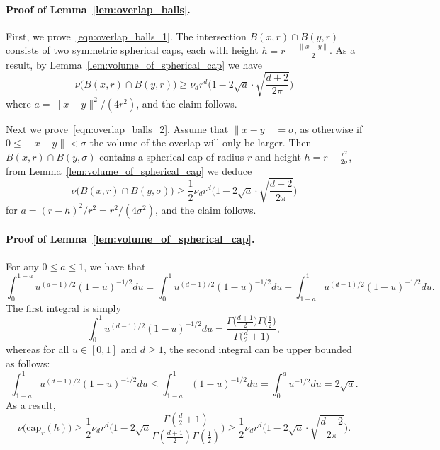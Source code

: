 \paragraph{Proof of Lemma~\ref{lem:overlap_balls}.}
	First, we prove~\eqref{eqn:overlap_balls_1}. The intersection $B(x,r) \cap B(y,r)$ consists of two symmetric spherical caps, each with height $h = r - \frac{\|x - y\|}{2}$. 
	As a result, by Lemma~\ref{lem:volume_of_spherical_cap} we have
	\begin{equation*}
	\nu\bigl(B(x,r) \cap B(y,r)\bigr) \geq \nu_d r^d \bigl(1 - 2\sqrt{a} \cdot \sqrt{\frac{d + 2}{2\pi}}\bigr)
	\end{equation*}
	where $a = \|x - y\|^2/(4r^2)$, and the claim follows.
	
	Next we prove~\eqref{eqn:overlap_balls_2}. Assume that $\|x - y\| = \sigma$, as otherwise if $0 \leq \|x - y\| < \sigma$ the volume of the overlap will only be larger. Then $B(x,r) \cap B(y,\sigma)$ contains a spherical cap of radius $r$ and height $h = r - \frac{r^2}{2\sigma}$, from Lemma~\ref{lem:volume_of_spherical_cap} we deduce
	\begin{equation*}
	\nu\bigl(B(x,r) \cap B(y,\sigma)\bigr) \geq \frac{1}{2}\nu_dr^d\biggl(1 - 2\sqrt{a}\cdot\sqrt{\frac{d + 2}{2\pi}}\biggr)
	\end{equation*}
	for $a = (r - h)^2/r^2 = r^2/(4\sigma^2)$, and the claim follows.

\paragraph{Proof of Lemma~\ref{lem:volume_of_spherical_cap}.}
	For any $0 \leq a \leq 1$, we have that
	\begin{equation*}
	\int_{0}^{1 - a}u^{(d-1)/2}(1 - u)^{-1/2}du = \int_{0}^{1}u^{(d-1)/2}(1 - u)^{-1/2}du - \int_{1 - a}^{1}u^{(d-1)/2}(1 - u)^{-1/2}du. 
	\end{equation*}
	The first integral is simply
	\begin{equation*}
	\int_{0}^{1}u^{(d-1)/2}(1 - u)^{-1/2}du = \frac{\Gamma\bigl(\frac{d + 1}{2}\bigr)\Gamma\bigl(\frac{1}{2}\bigr)}{ \Gamma\bigl(\frac{d}{2}+ 1\bigr)},
	\end{equation*}
	whereas for all $u \in [0,1]$ and $d \geq 1$, the second integral can be upper bounded as follows:
	\begin{equation*}
	\int_{1 - a}^{1}u^{(d-1)/2}(1 - u)^{-1/2}du \leq \int_{1 - a}^{1}(1 - u)^{-1/2}du = \int_{0}^{a} u^{-1/2}du = 2\sqrt{a}.
	\end{equation*}
	As a result, 
	\begin{equation*}
	\nu\bigl(\mathrm{cap}_r(h)\bigr) \geq \frac{1}{2}\nu_dr^d \biggl(1 - 2\sqrt{a}\frac{\Gamma(\frac{d}{2} + 1)}{\Gamma(\frac{d + 1}{2})\Gamma(\frac{1}{2})}\biggr)  \geq \frac{1}{2}\nu_dr^d \biggl(1 - 2\sqrt{a} \cdot \sqrt{\frac{d + 2}{2\pi}}\biggr).
	\end{equation*}

